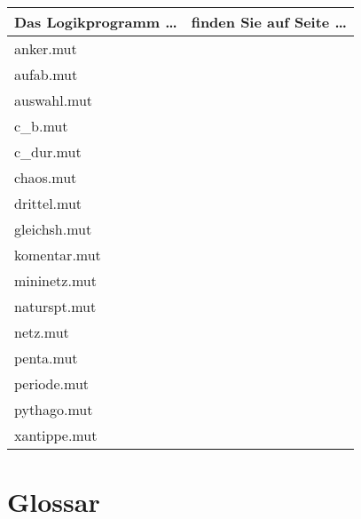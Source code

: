 \begin{center}
\begin{tabular}{l|c}
Das Logikprogramm \dots{} & finden Sie auf Seite \dots{} \\ \hline
anker.mut & \pageref{ANKER} \\
aufab.mut & \pageref{AUFAB} \\
auswahl.mut & \pageref{AUSWAHL} \\
c\_b.mut & \pageref{CB} \\
c\_dur.mut & \pageref{CDUR} \\
chaos.mut & \pageref{CHAOS} \\
drittel.mut  &  \pageref{DRITTEL} \\
gleichsh.mut & \pageref{GLEICHSCH} \\
komentar.mut & \pageref{KOMENTAR} \\
mininetz.mut & \pageref{MININETZ} \\
naturspt.mut & \pageref{NATURSPT} \\
netz.mut & \pageref{NETZ} \\
penta.mut & \pageref{PENTA} \\
periode.mut & \pageref{PERIODE} \\
pythago.mut & \pageref{PYTHAGO} \\
xantippe.mut & \pageref{XANTIPPE} \\
\end{tabular}
\end{center}

\chapter{Glossar}\label{cha:glossar}

